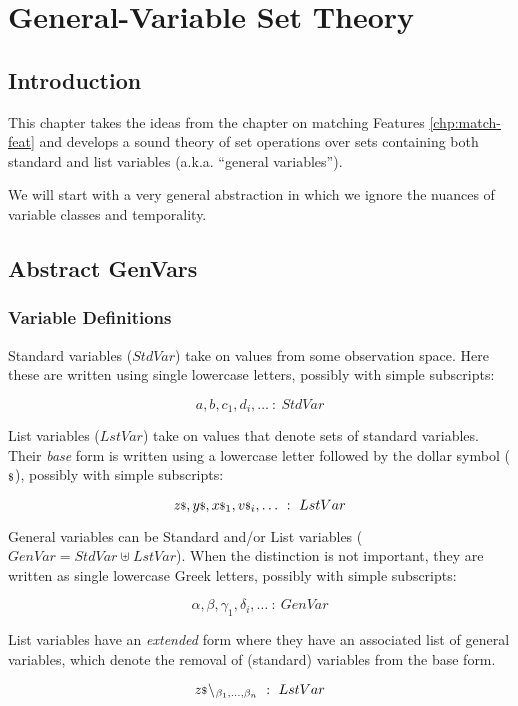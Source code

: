 \chapter{General-Variable Set Theory}\label{chp:genvar-set-theory}

\section{Introduction}

This chapter takes the ideas from the chapter on matching Features
\ref{chp:match-feat}
and develops a sound theory of set operations over sets containing
both standard and list variables (a.k.a. ``general variables'').

We will start with a very general abstraction in which we ignore the
nuances of variable classes and temporality.

\section{Abstract GenVars}

\subsection{Variable Definitions}

Standard variables ($StdVar$) take on values from some observation space.
Here these are written using single lowercase letters, 
possibly with simple subscripts:

$$a,b,c_1,d_i,\dots  ~:~  StdVar$$

List variables ($LstVar$) take on values that denote sets of standard variables.
Their \emph{base} form is written 
using a lowercase letter followed by the dollar symbol (${\scriptstyle{\mathsf{\$}}}$),
possibly with simple subscripts:

$$z{\scriptstyle{\mathsf{\$}}},y{\scriptstyle{\mathsf{\$}}},x{\scriptstyle{\mathsf{\$}}}_1,v{\scriptstyle{\mathsf{\$}}}_i,\dots ~:~ LstVar$$

General variables can be Standard and/or List variables
($GenVar = StdVar \uplus LstVar$).
When the distinction is not important,
they are written as single lowercase Greek letters, 
possibly with simple subscripts:

$$\alpha,\beta,\gamma_1,\delta_i,\dots ~:~ GenVar$$

List variables have an \emph{extended} form where they have an associated list
of general variables, 
which denote the removal of (standard) variables from the base form.

$$z{\scriptstyle{\mathsf{\$}}}{}\!\setminus\!{}_{\beta_1,\dots,\beta_n} ~:~ LstVar$$

